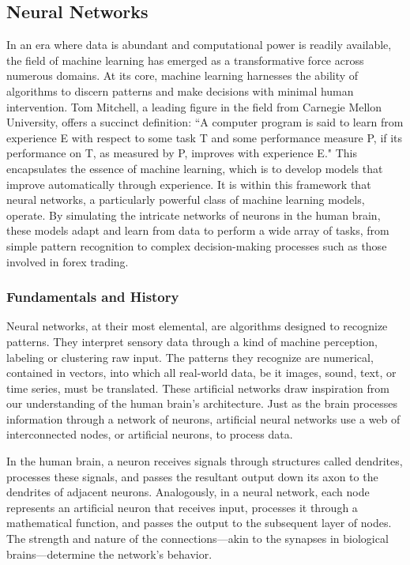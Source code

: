 \subsection{Neural Networks}

In an era where data is abundant and computational power is readily available, the field of machine learning has emerged as a transformative force across numerous domains. At its core, machine learning harnesses the ability of algorithms to discern patterns and make decisions with minimal human intervention. Tom Mitchell, a leading figure in the field from Carnegie Mellon University, offers a succinct definition: “A computer program is said to learn from experience E with respect to some task T and some performance measure P, if its performance on T, as measured by P, improves with experience E." This encapsulates the essence of machine learning, which is to develop models that improve automatically through experience. It is within this framework that neural networks, a particularly powerful class of machine learning models, operate. By simulating the intricate networks of neurons in the human brain, these models adapt and learn from data to perform a wide array of tasks, from simple pattern recognition to complex decision-making processes such as those involved in forex trading.

\subsubsection{Fundamentals and History}
Neural networks, at their most elemental, are algorithms designed to recognize patterns. They interpret sensory data through a kind of machine perception, labeling or clustering raw input. The patterns they recognize are numerical, contained in vectors, into which all real-world data, be it images, sound, text, or time series, must be translated. These artificial networks draw inspiration from our understanding of the human brain's architecture. Just as the brain processes information through a network of neurons, artificial neural networks use a web of interconnected nodes, or artificial neurons, to process data.

In the human brain, a neuron receives signals through structures called dendrites, processes these signals, and passes the resultant output down its axon to the dendrites of adjacent neurons. Analogously, in a neural network, each node represents an artificial neuron that receives input, processes it through a mathematical function, and passes the output to the subsequent layer of nodes. The strength and nature of the connections—akin to the synapses in biological brains—determine the network's behavior.

